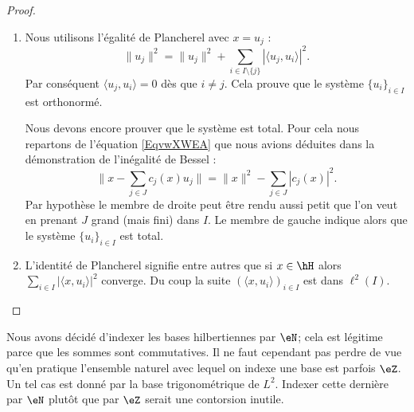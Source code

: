 \begin{proof}
\begin{enumerate}
		      \begin{subequations}
			      \begin{align}
				      \langle x, y\rangle & =\sum_{i\in I}\sum_{j\in I}\langle c_i(x)u_i, \overline{ c_j(y)u_j }\rangle \\
				                          & =\sum_{i\in I}\sum_{j\in J}c_i(x)\overline{ c_j(y) }\delta_{ij}             \\
				                          & =\sum_{i\in I}c_i(x)\overline{ c_i(y) }.
			      \end{align}
		      \end{subequations}
		\item
		      Nous utilisons l'égalité de Plancherel avec \( x=u_j\) :
		      \begin{equation}
			      \| u_j \|^2=\| u_j \|^2+\sum_{i\in I\setminus\{ j \}}| \langle u_j, u_i\rangle  |^2.
		      \end{equation}
		      Par conséquent \( \langle u_j, u_i\rangle =0\) dès que \( i\neq j\). Cela prouve que le système \( \{ u_i \}_{i\in I}\) est orthonormé.

		      Nous devons encore prouver que le système est total. Pour cela nous repartons de l'équation \eqref{EqvwXWEA} que nous avions déduites dans la démonstration de l'inégalité de Bessel :
		      \begin{equation}
			      \| x-\sum_{j\in J}c_j(x)u_j \|=\| x \|^2-\sum_{j\in J}| c_j(x) |^2.
		      \end{equation}
		      Par hypothèse le membre de droite peut être rendu aussi petit que l'on veut en prenant \( J\) grand (mais fini) dans \( I\). Le membre de gauche indique alors que le système \( \{ u_i \}_{i\in I}\) est total.

		\item
		      L'identité de Plancherel signifie entre autres que si \( x\in \hH\) alors \( \sum_{i\in I}| \langle x, u_i\rangle  |^2\) converge. Du coup la suite \( (\langle x, u_i\rangle )_{i\in I}\) est dans \( \ell^2(I)\).
	\end{enumerate}
\end{proof}


\begin{remark}
	Nous avons décidé d'indexer les bases hilbertiennes par \( \eN\); cela est légitime parce que les sommes sont commutatives. Il ne faut cependant pas perdre de vue qu'en pratique l'ensemble naturel avec lequel on indexe une base est parfois \( \eZ\). Un tel cas est donné par la base trigonométrique de \( L^2\). Indexer cette dernière par \( \eN\) plutôt que par \( \eZ\) serait une contorsion inutile.
\end{remark}

